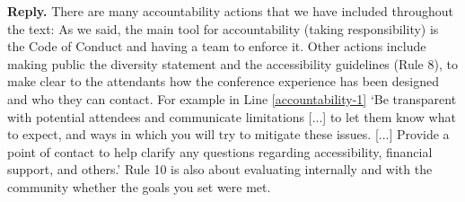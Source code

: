 \documentclass{article}
\newenvironment{Reply}{\noindent\color{BlueViolet}\textbf{Reply.}}{\vspace{1em}}
\begin{document}
\begin{Reply}
There are many accountability actions that we have included throughout the text: 
As we said, the main tool for accountability (taking responsibility) is the Code of Conduct and having a team to enforce it.
Other actions include making public the diversity statement and the accessibility guidelines (Rule 8), to make clear to the attendants how the conference experience has been designed and who they can contact.
For example in Line \ref{accountability-1} `Be transparent with potential attendees and communicate limitations [...] to let them know what to expect, and ways in which you will try to mitigate these issues. [...] Provide a point of contact to help clarify any questions regarding accessibility, financial support, and others.'
Rule 10 is also about evaluating internally and with the community whether the goals you set were met. 



\end{Reply}
\end{document}
